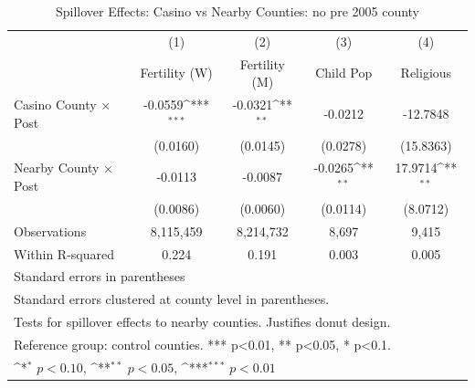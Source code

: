 \begin{table}[htbp]\centering
\def\sym#1{\ifmmode^{#1}\else\(^{#1}\)\fi}
\caption{Spillover Effects: Casino vs Nearby Counties: no pre 2005 county}
\begin{tabular}{l*{4}{c}}
\hline\hline
            &\multicolumn{1}{c}{(1)}&\multicolumn{1}{c}{(2)}&\multicolumn{1}{c}{(3)}&\multicolumn{1}{c}{(4)}\\
            &\multicolumn{1}{c}{Fertility (W)}&\multicolumn{1}{c}{Fertility (M)}&\multicolumn{1}{c}{Child Pop}&\multicolumn{1}{c}{Religious}\\
\hline
Casino County × Post&     -0.0559\sym{***}&     -0.0321\sym{**} &     -0.0212         &    -12.7848         \\
            &    (0.0160)         &    (0.0145)         &    (0.0278)         &   (15.8363)         \\
[1em]
Nearby County × Post&     -0.0113         &     -0.0087         &     -0.0265\sym{**} &     17.9714\sym{**} \\
            &    (0.0086)         &    (0.0060)         &    (0.0114)         &    (8.0712)         \\
\hline
Observations&   8,115,459         &   8,214,732         &       8,697         &       9,415         \\
Within R-squared&       0.224         &       0.191         &       0.003         &       0.005         \\
\hline\hline
\multicolumn{5}{l}{\footnotesize Standard errors in parentheses}\\
\multicolumn{5}{l}{\footnotesize Standard errors clustered at county level in parentheses.}\\
\multicolumn{5}{l}{\footnotesize Tests for spillover effects to nearby counties. Justifies donut design.}\\
\multicolumn{5}{l}{\footnotesize Reference group: control counties. *** p<0.01, ** p<0.05, * p<0.1.}\\
\multicolumn{5}{l}{\footnotesize \sym{*} \(p<0.10\), \sym{**} \(p<0.05\), \sym{***} \(p<0.01\)}\\
\end{tabular}
\end{table}
